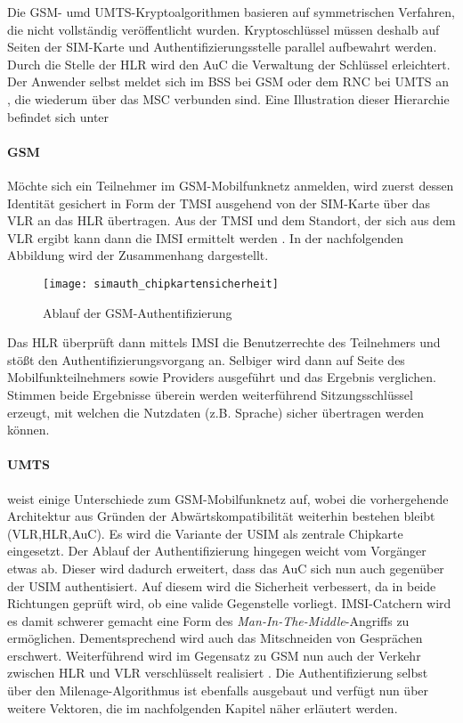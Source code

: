 Die GSM- umd UMTS-Kryptoalgorithmen basieren auf symmetrischen Verfahren, die nicht
vollständig veröffentlicht wurden. Kryptoschlüssel müssen deshalb auf
Seiten der SIM-Karte und Authentifizierungsstelle parallel aufbewahrt werden.
Durch die Stelle der \ac{HLR} wird den \ac{AuC} die Verwaltung der Schlüssel erleichtert.
Der Anwender selbst meldet sich im \ac{BSS} bei GSM oder dem \ac{RNC} bei UMTS an \cite{spitz11},
die wiederum über das \ac{MSC} verbunden sind. Eine Illustration dieser Hierarchie
befindet sich unter 

\paragraph{GSM}
Möchte sich ein Teilnehmer im GSM-Mobilfunknetz anmelden, wird zuerst dessen Identität
gesichert in Form der \ac{TMSI} ausgehend von der SIM-Karte über das \ac{VLR} an das
\ac{HLR} übertragen. Aus der \ac{TMSI} und dem Standort, der sich aus dem \ac{VLR}
ergibt kann dann die \ac{IMSI} ermittelt werden \cite{spitz11}. In der
nachfolgenden Abbildung wird der Zusammenhang dargestellt.

\begin{figure}[htp]
 \begin{center}
  \texttt{[image: simauth\_chipkartensicherheit]}
 \end{center}
 \caption[Ablauf der GSM-Authentifizierung]{Ablauf der GSM-Authentifizierung \cite{spitz11}}
 \label{abb:simauth}
\end{figure}

Das \ac{HLR} überprüft dann mittels \ac{IMSI} die Benutzerrechte des Teilnehmers und
stößt den Authentifizierungsvorgang an. Selbiger wird dann auf Seite des
Mobilfunkteilnehmers sowie Providers ausgeführt und das Ergebnis verglichen.
Stimmen beide Ergebnisse überein werden weiterführend Sitzungsschlüssel erzeugt,
mit welchen die Nutzdaten (z.B. Sprache) sicher übertragen werden können.

\paragraph{UMTS} weist einige Unterschiede zum GSM-Mobilfunknetz auf, wobei die
vorhergehende Architektur aus Gründen der Abwärtskompatibilität weiterhin bestehen bleibt
(\ac{VLR},\ac{HLR},\ac{AuC}). Es wird die Variante der USIM als zentrale Chipkarte
eingesetzt. Der Ablauf der Authentifizierung hingegen weicht vom Vorgänger etwas ab.
Dieser wird dadurch erweitert, dass das \ac{AuC} sich nun auch gegenüber der \ac{USIM}
authentisiert. Auf diesem wird die Sicherheit verbessert, da in beide Richtungen
geprüft wird, ob eine valide Gegenstelle vorliegt. \ac{IMSI}-Catchern wird es damit
schwerer gemacht eine Form des \textit{Man-In-The-Middle}-Angriffs zu ermöglichen.
Dementsprechend wird auch das Mitschneiden von Gesprächen erschwert. Weiterführend
wird im Gegensatz zu \ac{GSM} nun auch der Verkehr zwischen \ac{HLR} und \ac{VLR}
verschlüsselt realisiert \cite{spitz11}.
Die Authentifizierung selbst über den Milenage-Algorithmus ist ebenfalls ausgebaut
und verfügt nun über weitere Vektoren, die im nachfolgenden Kapitel näher
erläutert werden.

